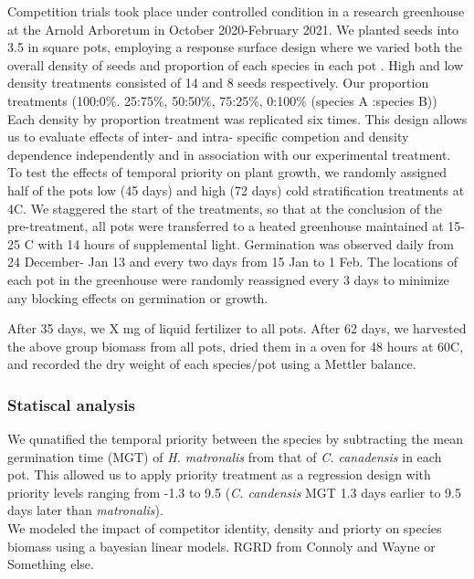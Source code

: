 \documentclass[11pt]{article}\usepackage[]{graphicx}\usepackage[]{color}
\begin{document}
\noindent Competition trials took place under controlled condition in a research greenhouse at the Arnold Arboretum in October 2020-February 2021. We planted seeds into 3.5 in square pots, employing a response surface design where we varied both the overall density of seeds and proportion of each species in each pot \citep{Inouye2001}. High and low density treatments consisted of 14 and 8 seeds respectively. Our proportion treatments (100:0\%. 25:75\%, 50:50\%, 75:25\%, 0:100\% (species A :species B)) Each density by proportion treatment was replicated six times. This design allows us to evaluate effects of inter- and intra- specific competion and density dependence independently and in association with our experimental treatment.\\

\noindent To test the effects of temporal priority on plant growth, we randomly assigned half of the pots low (45 days) and high (72 days) cold stratification treatments at 4\degree C. We staggered the start of the treatments, so that at the conclusion of the pre-treatment, all pots were transferred to a heated greenhouse maintained at 15-25 \degree C with 14 hours of supplemental light. Germination was observed daily from 24 December- Jan 13 and every two days from 15 Jan to 1 Feb. The locations of each pot in the greenhouse were randomly reassigned every 3 days to minimize any blocking effects on germination or growth.

\noident After 35 days, we X mg of liquid fertilizer to all pots. After 62 days, we harvested the above group biomass from all pots, dried them in a oven for 48 hours at 60\degree C, and recorded the dry weight of each species/pot using a Mettler balance.\\

\subsubsection*{Statiscal analysis}
\noindent We qunatified the temporal priority between the species by subtracting the mean germination time (MGT) of \textit{H. matronalis} from that of \textit{C. canadensis} in each pot. This allowed us to apply priority treatment as a regression design \citep{} with priority levels ranging from -1.3 to 9.5 (\textit{C. candensis} MGT 1.3 days earlier to 9.5 days later than \textit{matronalis}).\\

\noindent We modeled the impact of competitor identity, density and priorty on species biomass using a bayesian linear models. RGRD from Connoly and Wayne or Something else. 
\end{document}
